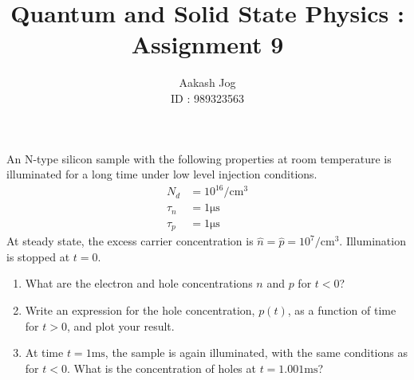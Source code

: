 \documentclass[fleqn, a4paper, 11pt, oneside]{amsart}
\title{Quantum and Solid State Physics : Assignment 9}
\author
{
	Aakash Jog\\
	ID : 989323563
}
\date{\formatdate{24}{12}{2015}}
\theoremstyle{definition}
\theoremstyle{theorem}
\begin{document}

\maketitle

\begin{question}
	An N-type silicon sample with the following properties at room temperature is illuminated for a long time under low level injection conditions.
	\begin{align*}
		N_d    & = 10^{16} \si{\per\centi\metre\cubed} \\
		\tau_n & = 1 \si{\micro\second}                \\
		\tau_p & = 1 \si{\micro\second}
	\end{align*}
	At steady state, the excess carrier concentration is $\hat{n} = \hat{p} = 10^7 \si{\per\centi\metre\cubed}$.
	Illumination is stopped at $t = 0$.
	\begin{enumerate}
		\item
			What are the electron and hole concentrations $n$ and $p$ for $t < 0$?
		\item
			Write an expression for the hole concentration, $p(t)$, as a function of time for $t > 0$, and plot your result.
		\item
			At time $t = 1 \si{\milli\second}$, the sample is again illuminated, with the same conditions as for $t < 0$.
			What is the concentration of holes at $t = 1.001 \si{\milli\second}$?
	\end{enumerate}
\end{question}
\end{document}
